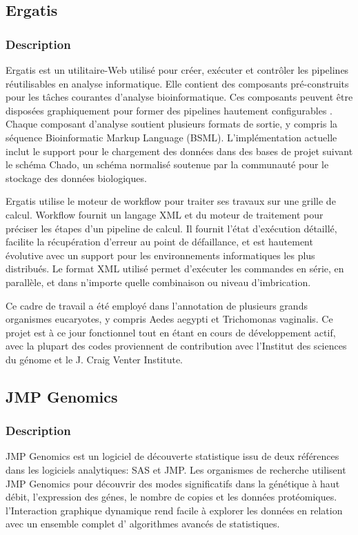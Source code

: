 \subsection{Ergatis}
\subsubsection{Description}

Ergatis est un utilitaire-Web  utilisé pour créer, exécuter et contrôler les pipelines réutilisables en analyse informatique. Elle contient des composants pré-construits pour les tâches courantes d'analyse bioinformatique. Ces composants peuvent être disposées graphiquement pour former des pipelines hautement configurables . Chaque composant d'analyse soutient plusieurs formats de sortie, y compris la séquence Bioinformatic Markup Language (BSML). L'implémentation actuelle inclut le support pour le chargement des données dans des bases de projet suivant le schéma Chado, un schéma normalisé soutenue par la communauté  pour le stockage des données biologiques.

Ergatis utilise le moteur de workflow pour traiter ses travaux sur une grille de calcul. Workflow fournit un langage XML et du moteur de traitement pour préciser les étapes d'un pipeline de calcul. Il fournit l'état d'exécution détaillé, facilite la récupération d'erreur au point de défaillance, et est hautement évolutive avec un support pour les environnements informatiques les plus distribués. Le format XML utilisé permet d'exécuter les commandes  en série, en parallèle, et dans n'importe quelle combinaison ou niveau d'imbrication.

Ce cadre de travail a été employé dans l'annotation de plusieurs grands organismes eucaryotes, y compris Aedes aegypti et Trichomonas vaginalis.
Ce projet est à ce jour fonctionnel tout en étant en cours de développement actif, avec la plupart des codes proviennent de contribution avec l'Institut des sciences du génome et le J. Craig Venter Institute.


\subsection{JMP Genomics}
\subsubsection{Description}
JMP Genomics est un logiciel de découverte statistique issu de deux références dans les logiciels analytiques: SAS et JMP. Les organismes de recherche utilisent JMP Genomics pour découvrir des modes significatifs dans la génétique à haut débit, l'expression des génes, le nombre de copies et les données protéomiques. l'Interaction graphique dynamique rend facile à explorer les données en relation avec un ensemble complet d' algorithmes avancés de statistiques.

